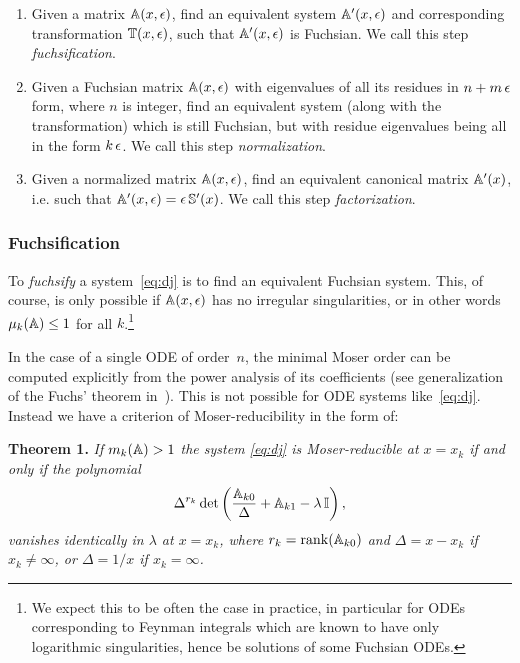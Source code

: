 \documentclass[12pt,a4paper]{article}
\begin{document}
\begin{enumerate}
    \item Given a matrix $\mathbb{A}(x,\epsilon)$, find an equivalent system $\mathbb{A}'(x,\epsilon)$ and corresponding transformation $\mathbb{T}(x,\epsilon)$, such that $\mathbb{A}'(x,\epsilon)$ is Fuchsian. We call this step \textit{fuchsification}.
    \item Given a Fuchsian matrix $\mathbb{A}(x,\epsilon)$ with eigenvalues of all its residues in $n+m\,\epsilon$ form, where $n$ is integer, find an equivalent system (along with the transformation) which is still Fuchsian, but with residue eigenvalues being all in the form $k\,\epsilon$. We call this step \textit{normalization}.
    \item Given a normalized matrix $\mathbb{A}(x,\epsilon)$, find an equivalent canonical matrix $\mathbb{A}'(x)$, i.e. such that $\mathbb{A}'(x,\epsilon) = \epsilon \, \mathbb{S}'(x)$. We call this step \textit{factorization}.
\end{enumerate}


\subsubsection{Fuchsification}
\label{sec:fuchs}

To \textit{fuchsify} a system~\eqref{eq:dj} is to find an equivalent Fuchsian system.
This, of course, is only possible if $\mathbb{A}(x,\epsilon)$ has no irregular singularities, or in other words $\mu_k(\mathbb{A})\le1$ for all $k$.\footnote{
    We expect this to be often the case in practice, in particular for ODEs corresponding to Feynman integrals which are known to have only logarithmic singularities, hence be solutions of some Fuchsian ODEs.
}

In the case of a single ODE of order~$n$, the minimal Moser order can be computed explicitly from the power analysis of its coefficients (see generalization of the Fuchs' theorem in~\cite{Mos59}).
This is not possible for ODE systems like~\eqref{eq:dj}.
Instead we have a criterion of Moser-reducibility in the form of:

\textbf{Theorem 1.}
{\em If $m_k(\mathbb{A}) > 1$ the system \eqref{eq:dj} is Moser-reducible at $x=x_k$ if and only if the polynomial}
\begin{equation}
\label{eq:red_cond}
    \Delta^{r_k} \det\left(\frac{\mathbb{A}_{k0}}{\Delta} + \mathbb{A}_{k1} - \lambda \,\mathbb{I}\right),
\end{equation}
{\em vanishes identically in $\lambda$ at $x=x_k$, where $r_k=\mathrm{rank}(\mathbb{A}_{k0})$ and $\Delta=x-x_k$ if $x_k\ne\infty$, or $\Delta=1/x$ if $x_k=\infty$.}
\end{document}
